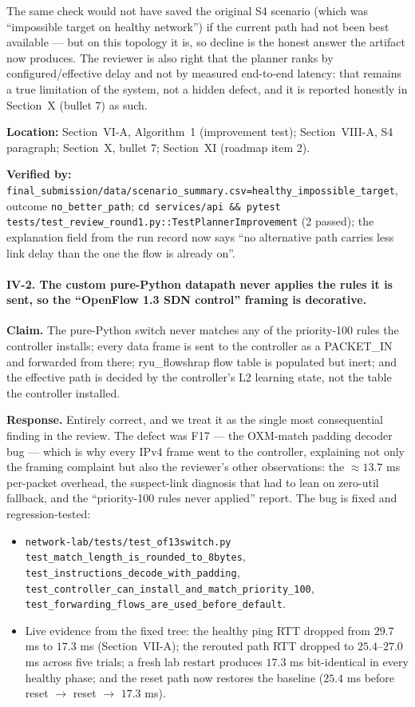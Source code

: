 \documentclass[11pt,a4paper]{article}
\begin{document}
The same check would not have saved the original S4 scenario (which was
``impossible target on healthy network'') if the current path had not been
best available --- but on this topology it is, so decline is the honest
answer the artifact now produces. The reviewer is also right that the
planner ranks by configured/effective delay and not by measured end-to-end
latency: that remains a true limitation of the system, not a hidden defect,
and it is reported honestly in Section~X (bullet 7) as such.

\textbf{Location:} Section~VI-A, Algorithm~1 (improvement test);
Section~VIII-A, S4 paragraph; Section~X, bullet 7; Section~XI (roadmap item 2).

\textbf{Verified by:}
\texttt{final\_submission/data/scenario\_summary.csv=healthy\_impossible\_target},
outcome \texttt{no\_better\_path};
\texttt{cd services/api \&\& pytest tests/test\_review\_round1.py::TestPlannerImprovement}\emph{\phantom{x}}
(2 passed); the explanation field from the run record now says ``no
alternative path carries less link delay than the one the flow is already on''.

\paragraph{IV-2. The custom pure-Python datapath never applies the rules it is
sent, so the ``OpenFlow 1.3 SDN control'' framing is decorative.}

\textbf{Claim.} The pure-Python switch never matches any of the priority-100
rules the controller installs; every data frame is sent to the controller as
a PACKET\_IN and forwarded from there; ryu\_flowshrap flow table is populated
but inert; and the effective path is decided by the controller's L2 learning
state, not the table the controller installed.

\textbf{Response.} Entirely correct, and we treat it as the single most
consequential finding in the review. The defect was F17 --- the OXM-match
padding decoder bug --- which is why every IPv4 frame went to the controller,
explaining not only the framing complaint but also the reviewer's other
observations: the $\approx 13.7$ ms per-packet overhead, the suspect-link
diagnosis that had to lean on zero-util fallback, and the ``priority-100
rules never applied'' report. The bug is fixed and regression-tested:

\begin{itemize}
\item \texttt{network-lab/tests/test\_of13switch.py} \texttt{test\_match\_length\_is\_rounded\_to\_8bytes},
  \texttt{test\_instructions\_decode\_with\_padding},
  \texttt{test\_controller\_can\_install\_and\_match\_priority\_100},
  \texttt{test\_forwarding\_flows\_are\_used\_before\_default}.
\item Live evidence from the fixed tree: the healthy ping RTT dropped from
  $29.7$ ms to $17.3$ ms (Section~VII-A); the rerouted path RTT dropped to
  $25.4$--$27.0$ ms across five trials; a fresh lab restart produces
  $17.3$ ms bit-identical in every healthy phase; and the reset path now
  restores the baseline ($25.4$ ms before reset $\to$ reset $\to$ $17.3$ ms).
\end{itemize}
\end{document}
